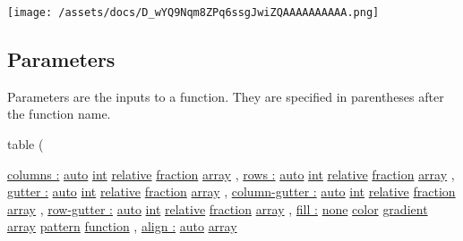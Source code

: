 \texttt{[image: /assets/docs/D\_wYQ9Nqm8ZPq6ssgJwiZQAAAAAAAAAA.png]}

\subsection{\texorpdfstring{{ Parameters
}}{ Parameters }}\label{parameters}

\label{parameters-tooltip}
Parameters are the inputs to a function. They are specified in
parentheses after the function name.

{ table } (

{ \hyperref[parameters-columns]{columns :}
\href{/docs/reference/foundations/auto/}{auto}
\href{/docs/reference/foundations/int/}{int}
\href{/docs/reference/layout/relative/}{relative}
\href{/docs/reference/layout/fraction/}{fraction}
\href{/docs/reference/foundations/array/}{array} , } {
\hyperref[parameters-rows]{rows :}
\href{/docs/reference/foundations/auto/}{auto}
\href{/docs/reference/foundations/int/}{int}
\href{/docs/reference/layout/relative/}{relative}
\href{/docs/reference/layout/fraction/}{fraction}
\href{/docs/reference/foundations/array/}{array} , } {
\hyperref[parameters-gutter]{gutter :}
\href{/docs/reference/foundations/auto/}{auto}
\href{/docs/reference/foundations/int/}{int}
\href{/docs/reference/layout/relative/}{relative}
\href{/docs/reference/layout/fraction/}{fraction}
\href{/docs/reference/foundations/array/}{array} , } {
\hyperref[parameters-column-gutter]{column-gutter :}
\href{/docs/reference/foundations/auto/}{auto}
\href{/docs/reference/foundations/int/}{int}
\href{/docs/reference/layout/relative/}{relative}
\href{/docs/reference/layout/fraction/}{fraction}
\href{/docs/reference/foundations/array/}{array} , } {
\hyperref[parameters-row-gutter]{row-gutter :}
\href{/docs/reference/foundations/auto/}{auto}
\href{/docs/reference/foundations/int/}{int}
\href{/docs/reference/layout/relative/}{relative}
\href{/docs/reference/layout/fraction/}{fraction}
\href{/docs/reference/foundations/array/}{array} , } {
\hyperref[parameters-fill]{fill :}
\href{/docs/reference/foundations/none/}{none}
\href{/docs/reference/visualize/color/}{color}
\href{/docs/reference/visualize/gradient/}{gradient}
\href{/docs/reference/foundations/array/}{array}
\href{/docs/reference/visualize/pattern/}{pattern}
\href{/docs/reference/foundations/function/}{function} , } {
\hyperref[parameters-align]{align :}
\href{/docs/reference/foundations/auto/}{auto}
\href{/docs/reference/foundations/array/}{array}
}
